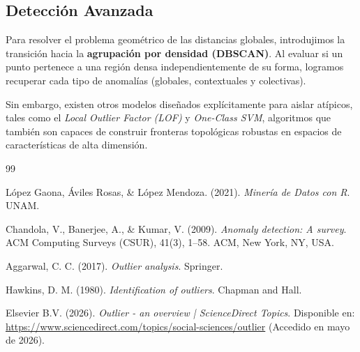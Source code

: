 \subsection{Detección Avanzada}

Para resolver el problema geométrico de las distancias globales, introdujimos la transición hacia la \textbf{agrupación por densidad (DBSCAN)}. Al evaluar si un punto pertenece a una región densa independientemente de su forma, logramos recuperar cada tipo de anomalías (globales, contextuales y colectivas).

Sin embargo, existen otros modelos diseñados explícitamente para aislar atípicos, tales como el \textit{Local Outlier Factor (LOF)} y \textit{One-Class SVM}, algoritmos que también son capaces de construir fronteras topológicas robustas en espacios de características de alta dimensión.

\begin{thebibliography}{99}
	
	López Gaona, Áviles Rosas, \& López Mendoza. (2021).
	\textit{Minería de Datos con R}.
	UNAM.
	
	Chandola, V., Banerjee, A., \& Kumar, V. (2009).
	\textit{Anomaly detection: A survey}.
	ACM Computing Surveys (CSUR), 41(3), 1--58.
	ACM, New York, NY, USA.
	
	Aggarwal, C. C. (2017).
	\textit{Outlier analysis}.
	Springer.
	
	Hawkins, D. M. (1980).
	\textit{Identification of outliers}.
	Chapman and Hall.
	
	Elsevier B.V. (2026).
	\textit{Outlier - an overview | ScienceDirect Topics}.
	Disponible en:
	\url{https://www.sciencedirect.com/topics/social-sciences/outlier}
	(Accedido en mayo de 2026).
	
\end{thebibliography}